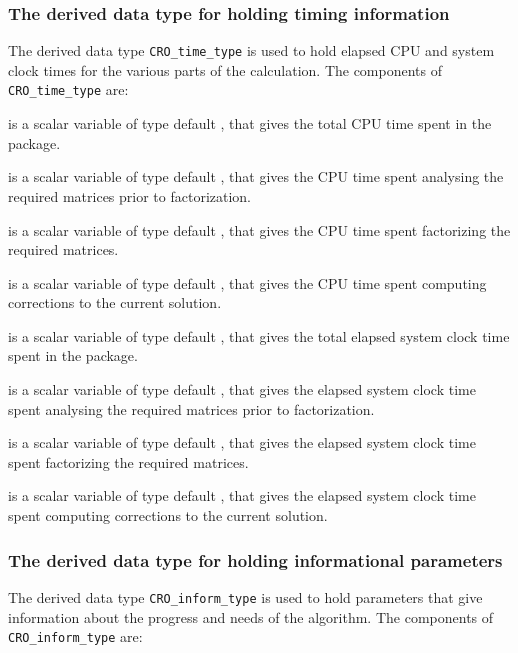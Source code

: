 \documentclass{galahad}
\newcommand{\packagename}{CRO}
\begin{document}

\subsubsection{The derived data type for holding timing
 information}\label{typetime}
The derived data type
{\tt \packagename\_time\_type}
is used to hold elapsed CPU and system clock times for the various parts of
the calculation. The components of
{\tt \packagename\_time\_type}
are:
\begin{description}
 is a scalar variable of type default \realdp, that gives
 the total CPU time spent in the package.

 is a scalar variable of type default \realdp, that gives
 the CPU time spent analysing the required matrices prior to factorization.

 is a scalar variable of type default \realdp, that gives
 the CPU time spent factorizing the required matrices.

 is a scalar variable of type default \realdp, that gives
 the CPU time spent computing corrections to the current solution.

 is a scalar variable of type default \realdp, that gives
 the total elapsed system clock time spent in the package.

 is a scalar variable of type default \realdp, that gives
 the elapsed system clock time spent analysing the required matrices prior to
factorization.

 is a scalar variable of type default \realdp, that gives
 the elapsed system clock time spent factorizing the required matrices.

 is a scalar variable of type default \realdp, that gives
 the elapsed system clock time spent computing corrections to
 the current solution.

\end{description}


\subsubsection{The derived data type for holding informational
 parameters}\label{typeinform}
The derived data type
{\tt \packagename\_inform\_type}
is used to hold parameters that give information about the progress and needs
of the algorithm. The components of
{\tt \packagename\_inform\_type}
are:
\end{document}

